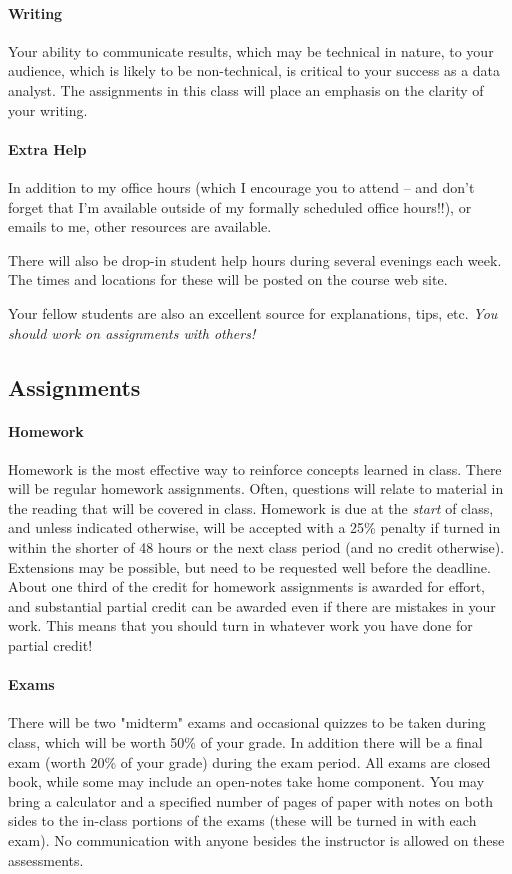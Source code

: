 \documentclass[11pt]{article}
\begin{document}
\paragraph{Writing}
Your ability to communicate results, which may be technical in nature, to your audience, which is likely to be non-technical, is critical to your success as a data analyst. The assignments in this class will place an emphasis on the clarity of your writing. 

\paragraph{Extra Help}
In addition to my office hours (which I encourage you to attend -- and don't forget that I'm available outside of my formally scheduled office hours!!), or emails to me, other resources are available.

There will also be drop-in student help hours during several evenings each week.  The times and locations for these will be posted on the course web site.

Your fellow students are also an excellent source for explanations, tips, etc.  \emph{You should work on assignments with others!}

\subsection*{Assignments}

\paragraph{Homework}
Homework is the most effective way to reinforce concepts learned in class. There will be regular homework assignments. Often, questions will relate to material in the reading that will be covered in class. Homework is due at the \emph{start} of class, and unless indicated otherwise, will be accepted with a 25\% penalty if turned in within the shorter of 48 hours or the next class period (and no credit otherwise).  Extensions may be possible, but need to be requested well before the deadline.  About one third of the credit for homework assignments is awarded for effort, and substantial partial credit can be awarded even if there are mistakes in your work.  This means that you should turn in whatever work you have done for partial credit!

\paragraph{Exams}
There will be two "midterm" exams and occasional quizzes to be taken during class, which will be
worth 50\% of your grade.  In addition there will be a final exam (worth 20\% of your grade) during the exam period.  All exams are closed book, while some may include an open-notes take home component.  You may bring a calculator and a specified number of pages of paper with notes on both sides to the in-class portions of the exams (these will be turned in with each exam).  No communication with anyone besides the instructor is allowed on these assessments.
\end{document}
